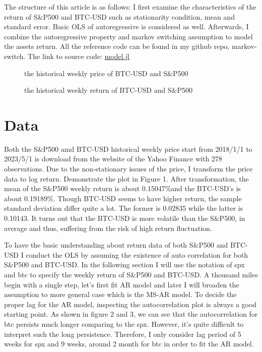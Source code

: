 \documentclass{article}
\begin{document}
  The structure of this article is as follows: I first examine the characteristics of the return 
of S\&P500 and BTC-USD such as stationarity condition, mean and standard error. 
Basic OLS of autoregressive is considered as well. Afterwards, I combine the autoregressive property and 
markov switching assumption to model the assets return. All the reference code can be found
in my github repo, markov-switch. The link to source code: \href{https://github.com/githubjacky/markov-switching/blob/main/src/model.jl}{model.jl}

\newpage

\begin{figure}[h!]
	\centering
	
	\caption{the historical weekly price of BTC-USD and S\&P500}
	
\end{figure}

\begin{figure}[h!]
	\centering
	
	\caption{the historical weekly return of BTC-USD and S\&P500}
	
\end{figure}


\newpage

\section{Data}
Both the S\&P500 amd BTC-USD historical weekly price start from 2018/1/1 to 2023/5/1 
is download from the website of the Yahoo Finance with 278 observations. Due to
the non-stationary issues of the price, I transform the price data to log return.
Demonstrate the plot in Figure 1. After transformation, the mean of the S\&P500 
weekly return is about 0.15047\%and the BTC-USD's is about
0.19189\%. Though BTC-USD seems to have higher return, the sample standard 
deviation differ quite a lot. The former is 0.02835 while the latter is 0.10143. 
It turns out that the BTC-USD is more volatile than the S\&P500, in average and thus, 
suffering from the risk of high return fluctuation.

To have the basic understanding about return data of both S\&P500 and BTC-USD 
I conduct the OLS by assuming the existence of auto correlation for both 
S\&P500 and BTC-USD. In the following section I will use the notation of spx and btc
to specify the weekly return of S\&P500 and BTC-USD.
A thousand miles begin with a single step,
let's first fit AR model and later I will broaden the assumption to more general case which
is the MS-AR model. To decide the proper lag for the AR model, inspecting the autocorrelation
plot is always a good starting point. As shown in figure 2 and 3, we can see that the 
autocorrelation for btc persists much longer comparing to the spx.
However, it's quite difficult to interpret such the long persistence. Therefore, 
I only consider lag period of 5 weeks for spx and 9 weeks, around 2 month for btc
in order to fit the AR model.
\end{document}
